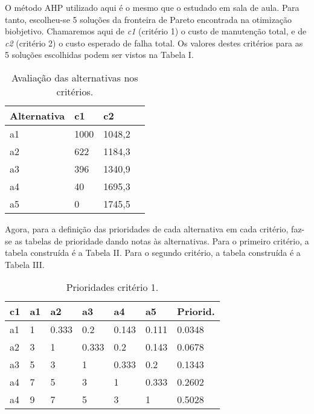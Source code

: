 O método AHP utilizado aqui é o mesmo que o estudado em sala de aula. Para tanto, escolheu-se 5 soluções da fronteira de Pareto encontrada na otimização biobjetivo. Chamaremos aqui de \textit{c1} (critério 1) o custo de manutenção total, e de \textit{c2} (critério 2) o custo esperado de falha total. Os valores destes critérios para as 5 soluções escolhidas podem ser vistos na Tabela I.
\begin{table}[h]
	\centering
	\begin{tabular}{ | l | l | l | l |}
		\hline
		Alternativa & c1 & c2 \\ \hline
		a1 & 1000 & 1048,2 \\ \hline
		a2 & 622 & 1184,3 \\ \hline
		a3 & 396 & 1340,9 \\ \hline
		a4 & 40 & 1695,3 \\ \hline
		a5 & 0 & 1745,5 \\ \hline
	\end{tabular}
	\label{table:c-ahp}
	\caption{Avaliação das alternativas nos critérios.}
\end{table}

Agora, para a definição das prioridades de cada alternativa em cada critério, faz-se as tabelas de prioridade dando notas às alternativas. Para o primeiro critério, a tabela construída é a Tabela II. Para o segundo critério, a tabela construída é a Tabela III.
\begin{table}[h]
	\centering
	\begin{tabular}{ | l | l | l | l | l | l | l | }
		\hline
		c1 & a1 & a2 & a3 & a4 & a5 & Priorid. \\ \hline
		a1 & 1 & 0.333 & 0.2 & 0.143 & 0.111 & 0.0348 \\ \hline
		a2 & 3 & 1 & 0.333 & 0.2 & 0.143 & 0.0678 \\ \hline
		a3 & 5 & 3 & 1 & 0.333 & 0.2 & 0.1343 \\ \hline
		a4 & 7 & 5 & 3 & 1 & 0.333 & 0.2602 \\ \hline
		a4 & 9 & 7 & 5 & 3 & 1 & 0.5028 \\ \hline
	\end{tabular}
	\label{table:c1}
	\caption{Prioridades critério 1.}
\end{table}

